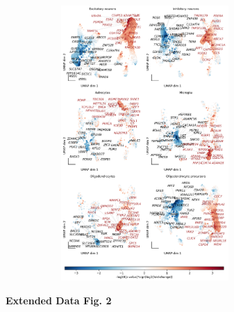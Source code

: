 \begin{figure}[H]
    \begin{subfigure}[t]{1\textwidth}
        \caption{}
        \centering
        \includegraphics[width=0.7\textwidth]{../paper/extended_plots/umap_projection_more_genes.png}        
    \end{subfigure}    
\end{figure}
\textbf{Extended Data Fig. 2}